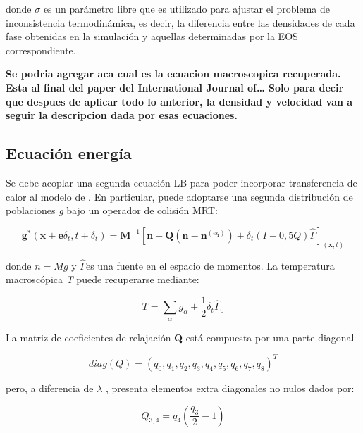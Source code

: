 donde $\sigma$ es un parámetro libre que es utilizado para ajustar el problema de inconsistencia termodinámica, es decir, la diferencia entre las densidades de cada fase obtenidas en la simulación y aquellas determinadas por la EOS correspondiente.

\textbf{Se podria agregar aca cual es la ecuacion macroscopica recuperada. Esta al final del paper del International Journal of… Solo para decir que despues de aplicar todo lo anterior, la densidad y velocidad van a seguir la descripcion dada por esas ecuaciones.}

\subsection{Ecuación energía}

Se debe acoplar una segunda ecuación LB para poder incorporar transferencia de calor al modelo de \cite{li2013lattice}. En particular, puede adoptarse una segunda distribución de poblaciones \textit{g} bajo un operador de colisión MRT:

\begin{equation}
    \mathbf{g^*}(\mathbf{x} + \mathbf{e} \delta_{t} ,t + \delta_{t}) = \mathbf{M}^{-1} \left[ \mathbf{n} - \mathbf{Q}(\mathbf{n} - \mathbf{n}^{(eq)}) + \delta_{t} \left( I - 0,5 Q \right) \hat{\Gamma}  \right]_{(\mathbf{x},t)}
    \label{eq:fieldenergy}
\end{equation}

donde $n = M g$ y $\hat{\Gamma}$es una fuente en el espacio de momentos. La temperatura macroscópica \textit{T} puede recuperarse mediante:

\begin{equation}
    T = \sum_{\alpha} g_{\alpha} + \frac{1}{2} \delta_{t} {\hat{\Gamma}}_{0}
\end{equation}

La matriz de coeficientes de relajación \textbf{Q} está compuesta por una parte diagonal

\begin{equation}
    \textit{diag} (Q) = {( q_{0} , q_{1} , q_{2} , q_{3} , q_{4} , q_{5} , q_{6} , q_{7} , q_{8} )}^{T}
\end{equation}

pero, a diferencia de $\lambda$ , presenta elementos extra diagonales no nulos dados por:

\begin{equation}
    Q_{3,4} = q_{4} \left( \frac{q_{3}}{2} - 1 \right)
\end{equation}

